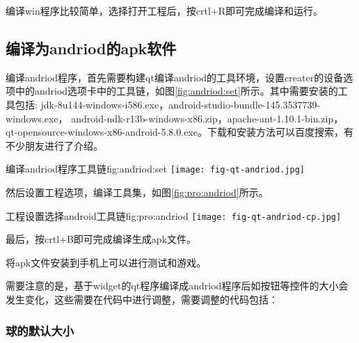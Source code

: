 \documentclass[11pt,twoside]{article} %
\begin{document}
编译win程序比较简单，选择打开工程后，按crtl+R即可完成编译和运行。

\subsection{编译为andriod的apk软件}

编译andriod程序，首先需要构建qt编译andriod的工具环境，设置creater的设备选项中的andriod选项卡中的工具链，如图\ref{fig:andriod:set}所示。其中需要安装的工具包括:
jdk-8u144-windows-i586.exe，android-studio-bundle-145.3537739-windows.exe，
android-ndk-r13b-windows-x86.zip，apache-ant-1.10.1-bin.zip，
qt-opensource-windows-x86-android-5.8.0.exe。下载和安装方法可以百度搜索，有不少朋友进行了介绍。

\begin{insertfigure}{编译andriod程序工具链}{fig:andriod:set}{}%
  \centering
  \texttt{[image: fig-qt-andriod.jpg]}
\end{insertfigure}

然后设置工程选项，编译工具集，如图\ref{fig:pro:andriod}所示。

\begin{insertfigure}{工程设置选择android工具链}{fig:pro:andriod}{}%
  \centering
  \texttt{[image: fig-qt-andriod-cp.jpg]}
\end{insertfigure}

最后，按crtl+B即可完成编译生成apk文件。

将apk文件安装到手机上可以进行测试和游戏。

需要注意的是，基于widget的qt程序编译成andriod程序后如按钮等控件的大小会发生变化，这些需要在代码中进行调整，需要调整的代码包括：


\subsubsection{球的默认大小}
\end{document}
